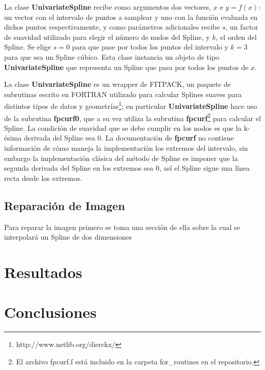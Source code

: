 \documentclass[a4paper, 11pt, spanish]{article}
\begin{document}
La clase \textbf{UnivariateSpline} recibe como argumentos dos vectores, $x$ e $y = f(x)$: un vector con el intervalo de puntos a samplear y uno con la funci\'on evaluada en dichos puntos respectivamente, y como par\'ametros adicionales recibe $s$, un factor de suavidad utilizado para elegir el n\'umero de nudos del Spline, y $k$, el orden del Spline. Se elige $s=0$ para que pase por todos los puntos del intervalo y $k=3$ para que sea un Spline c\'ubico. Esta clase instancia un objeto de tipo \textbf{UnivariateSpline} que representa un Spline que pasa por todos los puntos de $x$.

La clase \textbf{UnivariateSpline} es un wrapper de FITPACK, un paquete de subrutinas escrito en FORTRAN utilizado para calcular Splines suaves para distintos tipos de datos y geometr\'ias\footnote{http://www.netlib.org/dierckx/}; en particular \textbf{UnivariateSpline} hace uso de la subrutina \textbf{fpcurf0}, que a su vez utiliza la subrutina \textbf{fpcurf}\footnote{El archivo fpcurf.f est\'a incluido en la carpeta for\_routines en el repositorio.} para calcular el Spline.
La condici\'on de suavidad que se debe cumplir en los nodos es que la k-\'esima derivada del Spline sea 0. La documentaci\'on de \textbf{fpcurf} no contiene informaci\'on de c\'omo maneja la implementaci\'on los extremos del intervalo, sin embargo la implementaci\'on cl\'asica del m\'etodo de Spline es imponer que la segunda derivada del Spline en los extremos sea 0, as\'i el Spline sigue una l\'inea recta desde los extremos.

\subsection{Reparaci\'on de Imagen}
Para reparar la imagen primero se toma una secci\'on de ella sobre la cual se interpolar\'a un Spline de dos dimensiones

\section{Resultados}

\section{Conclusiones}
\end{document}
